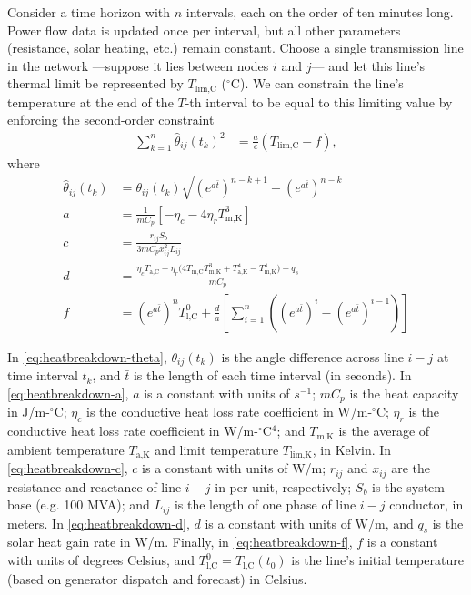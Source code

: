 \documentclass[journal,twoside]{IEEEtran}
\begin{document}
Consider a time horizon with $n$ intervals, each on the order of ten minutes long. Power flow data is updated once per interval, but all other parameters (resistance, solar heating, etc.) remain constant. Choose a single transmission line in the network ---suppose it lies between nodes $i$ and $j$--- and let this line's thermal limit be represented by $T_\text{lim,C}$ ($^\circ$C). We can constrain the line's temperature at the end of the $T$-th interval to be equal to this limiting value by enforcing the second-order constraint
\begin{align}\label{eq:tempconstraint}
\sum_{k=1}^n \hat{\theta}_{ij}(t_k)^2 &= \frac{a}{c}\left(T_\text{lim,C} - f\right),
\end{align}
where
\begin{subequations}\label{eq:heatbreakdown}
\begin{align}
\label{eq:heatbreakdown-theta}\hat{\theta}_{ij}(t_{k}) &= \theta_{ij}(t_k)\sqrt{ (e^{a\bar{t}})^{n-k+1} - (e^{a\bar{t}})^{n-k} } \\
\label{eq:heatbreakdown-a}a &= \frac{1}{mC_p}\left[ -\eta_c - 4\eta_r T_\text{m,K}^3 \right] \\
\label{eq:heatbreakdown-c}c &= \frac{r_{ij}S_b}{3 mC_p x_{ij}^2L_{ij}} \\
\label{eq:heatbreakdown-d}d &= \frac{ \eta_cT_\text{a,C} + \eta_r\big( 4T_\text{m,C}T_\text{m,K}^3 + T_\text{a,K}^4 - T_\text{m,K}^4   \big) + q_s }{mC_p} \\
\label{eq:heatbreakdown-f}f &= (e^{a\bar{t}})^n T_\text{l,C}^0 + \frac{d}{a}\left[ \sum_{i=1}^n \left( (e^{a\bar{t}})^i - (e^{a\bar{t}})^{i-1} \right)\right]
\end{align}
\end{subequations}

In \eqref{eq:heatbreakdown-theta}, $\theta_{ij}(t_k)$ is the angle difference across line $i-j$ at time interval $t_k$, and $\bar{t}$ is the length of each time interval (in seconds). In \eqref{eq:heatbreakdown-a}, $a$ is a constant with units of $s^{-1}$; $mC_p$ is the heat capacity in J/m-$^\circ$C; $\eta_c$ is the conductive heat loss rate coefficient in W/m-$^\circ$C; $\eta_r$ is the conductive heat loss rate coefficient in W/m-$^\circ$C$^4$; and $T_\text{m,K}$ is the average of ambient temperature $T_\text{a,K}$ and limit temperature $T_\text{lim,K}$, in Kelvin. In \eqref{eq:heatbreakdown-c}, $c$ is a constant with units of W/m; $r_{ij}$ and $x_{ij}$ are the resistance and reactance of line $i-j$ in per unit, respectively; $S_b$ is the system base (e.g. 100 MVA); and $L_{ij}$ is the length of one phase of line $i-j$ conductor, in meters. In \eqref{eq:heatbreakdown-d}, $d$ is a constant with units of W/m, and $q_s$ is the solar heat gain rate in W/m. Finally, in \eqref{eq:heatbreakdown-f}, $f$ is a constant with units of degrees Celsius, and $T_\text{l,C}^0 = T_\text{l,C}(t_0)$ is the line's initial temperature (based on generator dispatch and forecast) in Celsius.
\end{document}
